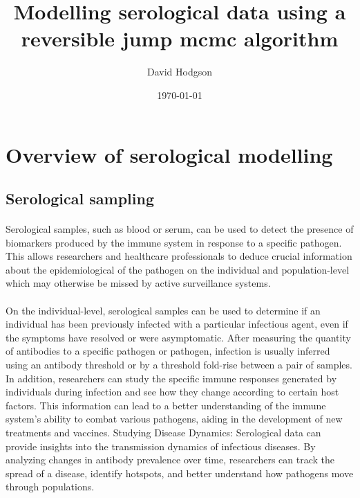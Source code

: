 \documentclass{article}
\title{Modelling serological data using a reversible jump mcmc algorithm}
\author{David Hodgson}
\date{\today}
\begin{document}
\maketitle

\section{Overview of serological modelling}

\subsection{Serological sampling}


\paragraph{}Serological samples, such as blood or serum, can be used to detect the presence of biomarkers produced by the immune system in response to a specific pathogen.  This allows researchers and healthcare professionals to deduce crucial information about the epidemiological of the pathogen on the individual and population-level which may otherwise be missed by active surveillance systems.

\paragraph{}On the individual-level, serological samples can be used to determine if an individual has been previously infected with a particular infectious agent, even if the symptoms have resolved or were asymptomatic. After measuring the quantity of antibodies to a specific pathogen or pathogen, infection is usually inferred using an antibody threshold or by a threshold fold-rise between a pair of samples. In addition, researchers can study the specific immune responses generated by individuals during infection and see how they change according to certain host factors. This information can lead to a better understanding of the immune system's ability to combat various pathogens, aiding in the development of new treatments and vaccines. Studying Disease Dynamics: Serological data can provide insights into the transmission dynamics of infectious diseases. By analyzing changes in antibody prevalence over time, researchers can track the spread of a disease, identify hotspots, and better understand how pathogens move through populations.
\end{document}
